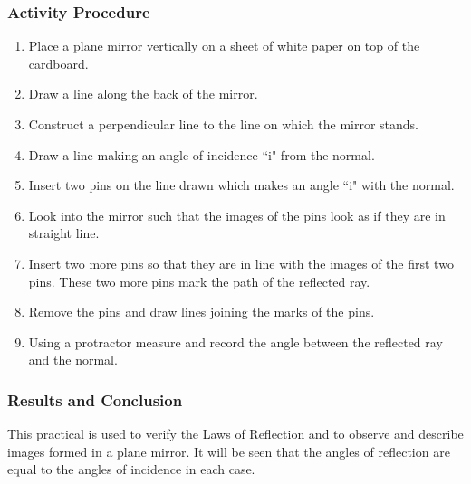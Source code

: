 \subsubsection{Activity Procedure}
\begin{enumerate}
\item{Place a plane mirror vertically on a sheet of white paper on top of the cardboard.}
\item{Draw a line along the back of the mirror.}
\item{Construct a perpendicular line to the line on which the mirror stands.}  
\item{Draw a line making an angle of incidence ``i" from the normal.}
\item{Insert two pins on the line drawn which makes an angle ``i" with the normal.}
\item{Look into the mirror such that the images of the pins look as if they are in straight line.}
\item{Insert two more pins so that they are in line with the images of the first two pins.  These two more pins mark the path of the reflected ray.}
\item{Remove the pins and draw lines joining the marks of the pins.}
\item{Using a protractor measure and record the angle between the reflected ray and the normal.}
\end{enumerate}

\subsubsection*{Results and Conclusion}
This practical is used to verify the Laws of Reflection and to observe and describe images formed in a plane mirror.  It will be seen that the angles of reflection are equal to the angles of incidence in each case.

